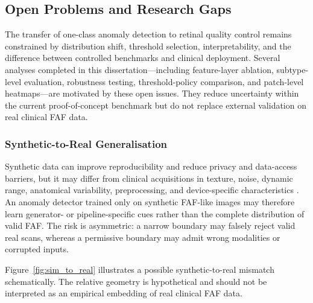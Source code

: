 \documentclass[fleqn,12pt]{olplainarticle}
\begin{document}
\subsection{Open Problems and Research Gaps}
\label{sec:open_problems}

The transfer of one-class anomaly detection to retinal quality control remains constrained by distribution shift, threshold selection, interpretability, and the difference between controlled benchmarks and clinical deployment. Several analyses completed in this dissertation---including feature-layer ablation, subtype-level evaluation, robustness testing, threshold-policy comparison, and patch-level heatmaps---are motivated by these open issues. They reduce uncertainty within the current proof-of-concept benchmark but do not replace external validation on real clinical FAF data.

\subsubsection{Synthetic-to-Real Generalisation}

Synthetic data can improve reproducibility and reduce privacy and data-access barriers, but it may differ from clinical acquisitions in texture, noise, dynamic range, anatomical variability, preprocessing, and device-specific characteristics \cite{chen2021synthetic,veturi2023syntheye}. An anomaly detector trained only on synthetic FAF-like images may therefore learn generator- or pipeline-specific cues rather than the complete distribution of valid FAF. The risk is asymmetric: a narrow boundary may falsely reject valid real scans, whereas a permissive boundary may admit wrong modalities or corrupted inputs.

Figure~\ref{fig:sim_to_real} illustrates a possible synthetic-to-real mismatch schematically. The relative geometry is hypothetical and should not be interpreted as an empirical embedding of real clinical FAF data.
\end{document}
